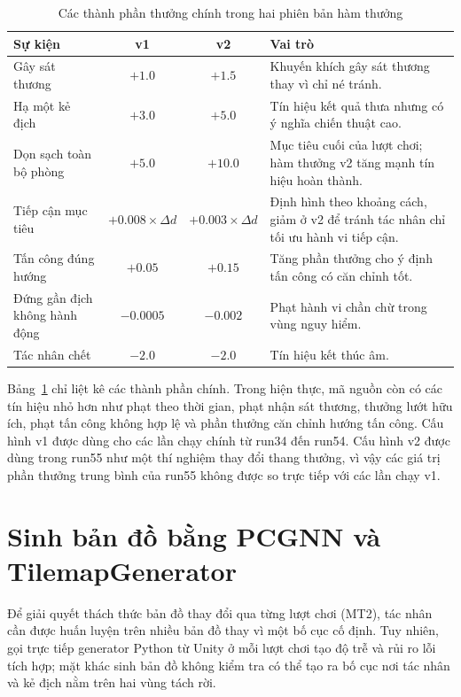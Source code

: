 \begin{table}[H]
    \centering
    \small
    \caption{Các thành phần thưởng chính trong hai phiên bản hàm thưởng}
    \label{tab:reward_components}
    \begin{tabular}{|p{4.4cm}|c|c|p{5.2cm}|}
        \hline
        \textbf{Sự kiện} & \textbf{v1} & \textbf{v2} & \textbf{Vai trò} \\
        \hline
        Gây sát thương & $+1.0$ & $+1.5$ & Khuyến khích gây sát thương thay vì chỉ né tránh. \\
        \hline
        Hạ một kẻ địch & $+3.0$ & $+5.0$ & Tín hiệu kết quả thưa nhưng có ý nghĩa chiến thuật cao. \\
        \hline
        Dọn sạch toàn bộ phòng & $+5.0$ & $+10.0$ & Mục tiêu cuối của lượt chơi; hàm thưởng v2 tăng mạnh tín hiệu hoàn thành. \\
        \hline
        Tiếp cận mục tiêu & $+0.008 \times \Delta d$ & $+0.003 \times \Delta d$ & Định hình theo khoảng cách, giảm ở v2 để tránh tác nhân chỉ tối ưu hành vi tiếp cận. \\
        \hline
        Tấn công đúng hướng & $+0.05$ & $+0.15$ & Tăng phần thưởng cho ý định tấn công có căn chỉnh tốt. \\
        \hline
        Đứng gần địch không hành động & $-0.0005$ & $-0.002$ & Phạt hành vi chần chừ trong vùng nguy hiểm. \\
        \hline
        Tác nhân chết & $-2.0$ & $-2.0$ & Tín hiệu kết thúc âm. \\
        \hline
    \end{tabular}
\end{table}

Bảng~\ref{tab:reward_components} chỉ liệt kê các thành phần chính. Trong hiện thực, mã nguồn còn có các tín hiệu nhỏ hơn như phạt theo thời gian, phạt nhận sát thương, thưởng lướt hữu ích, phạt tấn công không hợp lệ và phần thưởng căn chỉnh hướng tấn công. Cấu hình v1 được dùng cho các lần chạy chính từ run34 đến run54. Cấu hình v2 được dùng trong run55 như một thí nghiệm thay đổi thang thưởng, vì vậy các giá trị phần thưởng trung bình của run55 không được so trực tiếp với các lần chạy v1.

\section{Sinh bản đồ bằng PCGNN và TilemapGenerator}

Để giải quyết thách thức bản đồ thay đổi qua từng lượt chơi (MT2), tác nhân cần được huấn luyện trên nhiều bản đồ thay vì một bố cục cố định. Tuy nhiên, gọi trực tiếp generator Python từ Unity ở mỗi lượt chơi tạo độ trễ và rủi ro lỗi tích hợp; mặt khác sinh bản đồ không kiểm tra có thể tạo ra bố cục nơi tác nhân và kẻ địch nằm trên hai vùng tách rời.

